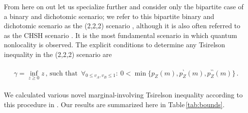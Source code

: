 \documentclass[
  12pt          %
  ,letterpaper  %
  ,center       %
  ,noupper      %
  ,english,fleqn]{uconnthesis}
\newcommand{\brackets}[1]{\lbrace{#1\rbrace}}
\newcommand{\LeftEqns}[1]{\begin{fleqn}[\leftmargini minus \leftmargini]\begin{align}#1\end{align}\end{fleqn}}
\newcommand{\LeftEqn}[1]{\LeftEqns{\begin{split}#1\end{split}}}
\newcommand{\tab}[1]{Table\,\ref{#1}}
\begin{document}
From here on out let us specialize further and consider only the bipartite case of a binary and dichotomic scenario; we refer to this bipartite binary and dichotomic scenario as the (2,2,2) scenario \cite{GisinFramework2012}, although it is also often referred to as the CHSH scenario \cite{CHSHOriginal}. It is the most fundamental scenario in which quantum nonlocality is observed. The explicit conditions to determine any Tsirelson inequality in the (2,2,2) scenario are
\LeftEqn{\label{eq:gammasol222}
\gamma = \inf_{z\geq 0}z\, \text{, such that }\, \forall_{0\leq v_A,v_B \leq 1}:\: 0< \min\brackets{p_Z(m),p_Z^{\backprime}(m),p_Z^{\backprime\backprime}(m)}\,.
}

We calculated various novel marginal-involving Tsirelson inequality according to this procedure in \citet{WolfeQB}. Our results are summarized here in \tab{tab:bounds}.  
\end{document}
